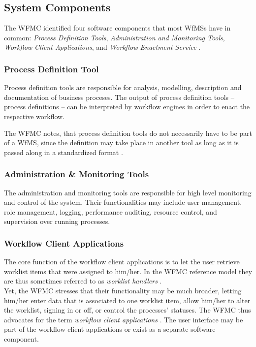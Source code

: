  \subsection{System Components} %
  \label{sub:system_components}
    The \ac{WFMC} identified four software components that most \ac{WfMS}s have in common: \emph{Process Definition Tools}, \emph{Administration and Monitoring Tools}, \emph{Workflow Client Applications}, and \emph{Workflow Enactment Service} \cite{Hollingsworth1995Wfmc}.

    \subsubsection{Process Definition Tool} %
    \label{ssub:process_definition_tool}
      Process definition tools are responsible for analysis, modelling, description and documentation of business proceses. The output of process definition tools -- process definitions -- can be interpreted by workflow engines in order to enact the respective workflow.

      The \ac{WFMC} notes, that process definition tools do not necessarily have to be part of a \ac{WfMS}, since the definition may take place in another tool as long as it is passed along in a standardized format \cite{Hollingsworth1995Wfmc}.

    \subsubsection{Administration \& Monitoring Tools} %
    \label{ssub:administration_&_monitoring_tools}

      The administration and monitoring tools are responsible for high level monitoring and control of the system. Their functionalities may include user management, role management, logging, performance auditing, resource control, and supervision over running processes.

    \subsubsection{Workflow Client Applications} %
    \label{ssub:workflow_client_applications}
      The core function of the workflow client applications is to let the user retrieve worklist items that were assigned to him/her. In the \ac{WFMC} reference model they are thus sometimes referred to as \emph{worklist handlers} \cite{Hollingsworth1995Wfmc}. \\
      Yet, the \ac{WFMC} stresses that their functionality may be much broader, \eg letting him/her enter data that is associated to one worklist item, allow him/her to alter the worklist, signing in or off, or control the processes' statuses. The \ac{WFMC} thus advocates for the term \emph{workflow client applications} \cite{Hollingsworth1995Wfmc}.
      The user interface may be part of the workflow client applications or exist as a separate software component.

